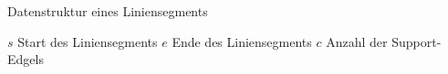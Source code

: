 \begin{algorithm}[ht]
\caption{Datenstruktur eines Liniensegments}
\label{alg:datastructure-line}
	\begin{algorithmic}[1]
		\State $s$
		\Comment Start des Liniensegments
		\State $e$
		\Comment Ende des Liniensegments
		\State $c$
		\Comment Anzahl der Support-Edgels
	\end{algorithmic}
\end{algorithm}

